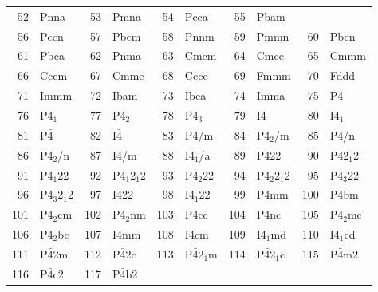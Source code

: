 \documentclass[11pt,a4paper]{report}
\begin{document}
\begin{table}[h!]
\begin{center}
\begin{tabular}{||r|l||r|l||r|l||r|l||r|l||}
52     & Pnna               & 
53     & Pmna               & 
54     & Pcca               & 
55     & Pbam               \\
56     & Pccn               & 
57     & Pbcm               & 
58     & Pnnm               & 
59     & Pmmn               & 
60     & Pbcn               \\
61     & Pbca               & 
62     & Pnma               & 
63     & Cmcm               & 
64     & Cmce               & 
65     & Cmmm               \\
66     & Cccm               & 
67     & Cmme               & 
68     & Ccce               & 
69     & Fmmm               & 
70     & Fddd               \\
71     & Immm               & 
72     & Ibam               & 
73     & Ibca               & 
74     & Imma               & 
75     & P4                 \\
76     & P4$_1$             & 
77     & P4$_2$             & 
78     & P4$_3$             & 
79     & I4                 & 
80     & I4$_1$             \\
81     & P$\bar{4}$                & 
82     & I$\bar{4}$                & 
83     & P4/m               & 
84     & P4$_2$/m           & 
85     & P4/n               \\
86     & P4$_2$/n           & 
87     & I4/m               & 
88     & I4$_1$/a           & 
89     & P422               & 
90     & P42$_1$2           \\
91     & P4$_1$22           & 
92     & P4$_1$2$_1$2       & 
93     & P4$_2$22           & 
94     & P4$_2$2$_1$2       & 
95     & P4$_3$22           \\
96     & P4$_3$2$_1$2       & 
97     & I422               & 
98     & I4$_1$22           & 
99     & P4mm               & 
100    & P4bm               \\
101    & P4$_2$cm           & 
102    & P4$_2$nm           & 
103    & P4cc               & 
104    & P4nc               & 
105    & P4$_2$mc           \\
106    & P4$_2$bc           & 
107    & I4mm               & 
108    & I4cm               & 
109    & I4$_1$md           & 
110    & I4$_1$cd           \\
111    & P$\bar{4}$2m              & 
112    & P$\bar{4}$2c              & 
113    & P$\bar{4}$2$_1$m          & 
114    & P$\bar{4}$2$_1$c          & 
115    & P$\bar{4}$m2              \\
116    & P$\bar{4}$c2              & 
117    & P$\bar{4}$b2              & 

\end{tabular}
\end{center}
\end{table}
\end{document}
